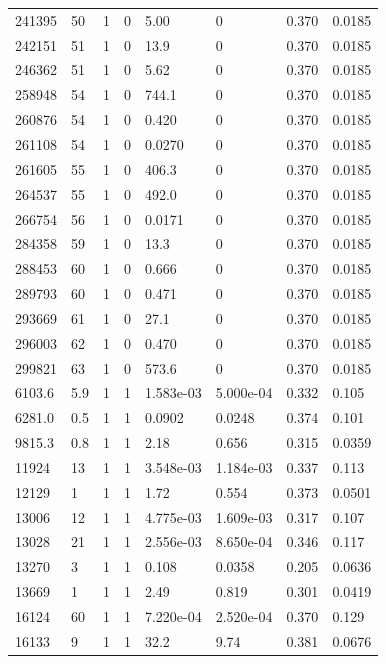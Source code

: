 \documentclass[preview]{standalone}
\begin{document}
{{{{{{{{{{{{{\begin{tabular}{L{1.2cm}C{1.2cm} C{0.3cm}C{0.5cm} C{1.4cm}C{1.4cm} C{1.4cm}C{1.4cm}}
  241395  &    50  & 1     &  0 &  5.00  & 0  & 0.370 &  0.0185   \\ 
  242151  &    51  & 1     &  0 &  13.9  & 0  & 0.370 &  0.0185   \\ 
  246362  &    51  & 1     &  0 &  5.62  & 0  & 0.370 &  0.0185   \\ 
  258948  &    54  & 1     &  0 &  744.1  & 0  & 0.370 &  0.0185   \\ 
  260876  &    54  & 1     &  0 &  0.420  & 0  & 0.370 &  0.0185   \\ 
  261108  &    54  & 1     &  0 &  0.0270  & 0  & 0.370 &  0.0185   \\ 
  261605  &    55  & 1     &  0 &  406.3  & 0  & 0.370 &  0.0185   \\ 
  264537  &    55  & 1     &  0 &  492.0  & 0  & 0.370 &  0.0185   \\ 
  266754  &    56  & 1     &  0 &  0.0171  & 0  & 0.370 &  0.0185   \\ 
  284358  &    59  & 1     &  0 &  13.3  & 0  & 0.370 &  0.0185   \\ 
  288453  &    60  & 1     &  0 &  0.666  & 0  & 0.370 &  0.0185   \\ 
  289793  &    60  & 1     &  0 &  0.471  & 0  & 0.370 &  0.0185   \\ 
  293669  &    61  & 1     &  0 &  27.1  & 0  & 0.370 &  0.0185   \\ 
  296003  &    62  & 1     &  0 &  0.470  & 0  & 0.370 &  0.0185   \\ 
  299821  &    63  & 1     &  0 &  573.6  & 0  & 0.370 &  0.0185   \\ 
  6103.6  &   5.9  & 1     &  1 &  1.583e-03  & 5.000e-04  & 0.332 &  0.105   \\ 
  6281.0  &   0.5  & 1     &  1 &  0.0902  & 0.0248  & 0.374 &  0.101   \\ 
  9815.3  &   0.8  & 1     &  1 &  2.18  & 0.656  & 0.315 &  0.0359   \\ 
  11924  &    13  & 1     &  1 &  3.548e-03  & 1.184e-03  & 0.337 &  0.113   \\ 
  12129  &     1  & 1     &  1 &  1.72  & 0.554  & 0.373 &  0.0501   \\ 
  13006  &    12  & 1     &  1 &  4.775e-03  & 1.609e-03  & 0.317 &  0.107   \\ 
  13028  &    21  & 1     &  1 &  2.556e-03  & 8.650e-04  & 0.346 &  0.117   \\ 
  13270  &     3  & 1     &  1 &  0.108  & 0.0358  & 0.205 &  0.0636   \\ 
  13669  &     1  & 1     &  1 &  2.49  & 0.819  & 0.301 &  0.0419   \\ 
  16124  &    60  & 1     &  1 &  7.220e-04  & 2.520e-04  & 0.370 &  0.129   \\ 
  16133  &     9  & 1     &  1 &  32.2  & 9.74  & 0.381 &  0.0676   \\ 
\hline 
\end{tabular} 

}}}}}}}}}}}}}
\end{document}
